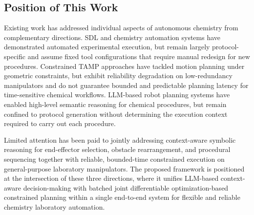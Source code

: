 \documentclass{ieeeaccess}
\begin{document}
\subsection{Position of This Work}\label{sec:2.4}
Existing work has addressed individual aspects of autonomous chemistry from complementary directions. SDL and chemistry automation systems have demonstrated automated experimental execution, but remain largely protocol-specific and assume fixed tool configurations that require manual redesign for new procedures. Constrained TAMP approaches have tackled motion planning under geometric constraints, but exhibit reliability degradation on low-redundancy manipulators and do not guarantee bounded and predictable planning latency for time-sensitive chemical workflows. LLM-based robot planning systems have enabled high-level semantic reasoning for chemical procedures, but remain confined to protocol generation without determining the execution context required to carry out each procedure.

Limited attention has been paid to jointly addressing context-aware symbolic reasoning for end-effector selection, obstacle rearrangement, and procedural sequencing together with reliable, bounded-time constrained execution on general-purpose laboratory manipulators. The proposed framework is positioned at the intersection of these three directions, where it unifies LLM-based context-aware decision-making with batched joint differentiable optimization-based constrained planning within a single end-to-end system for flexible and reliable chemistry laboratory automation.
\end{document}
